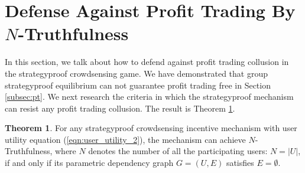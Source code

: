 \documentclass[conference]{IEEEtran}
\theoremstyle{definition}
\newtheorem{theorem}{Theorem}
\begin{document}
\section{Defense Against Profit Trading By $N$-Truthfulness}
\label{sec:DFPT}
In this section, we talk about how to defend against profit trading collusion in the strategyproof crowdsensing game. We have demonstrated that group strategyproof equilibrium can not guarantee profit trading free in Section \ref{subsec:pt}. We next research the criteria in which the strategyproof mechanism can resist any profit trading collusion. The result is Theorem \ref{thm:pt}.
\begin{theorem}
\label{thm:pt}
For any strategyproof crowdsensing incentive mechanism with user utility equation (\ref{eqn:user_utility_2}), the mechanism can achieve $N$-Truthfulness, where $N$ denotes the number of all the participating users: $N=|U|$, if and only if its parametric dependency graph $G=(U,E)$ satisfies $E=\emptyset$.
\end{theorem}
\end{document}
